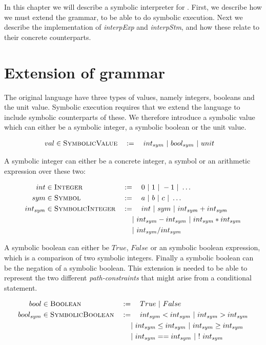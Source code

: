 In this chapter we will describe a symbolic interpreter for \explanguage. First, we describe how we must extend the grammar, to be able to do symbolic execution. Next we describe the implementation of \textsl{interpExp} and \textsl{interpStm}, and how these relate to their concrete counterparts. 
\section{Extension of grammar}

The original language have three types of values, namely integers, booleans and the unit value. Symbolic execution requires that we extend the language to include symbolic counterparts of these. We therefore introduce a symbolic value which can either be a symbolic integer, a symbolic boolean or the unit value.

\begin{alignat*}{3}
	val & \in \textsc{SymbolicValue} && := \quad int_{sym} \ | \ 
	bool_{sym} \ | \  unit
\end{alignat*}



 A symbolic integer can either be a concrete integer, a symbol or an arithmetic expression over these two:



\begin{alignat*}{3}
	int & \in \textsc{Integer} && := \quad 0 \ | \  1 \ | \  -1 \ | \  \ldots\\
	sym & \in \textsc{Symbol} && := \quad a \ | \  b \ | \  c \ | \  \ldots \\	
	int_{sym} & \in \textsc{SymbolicInteger} && := \quad int \ | \  sym \ | \  int_{sym} + int_{sym} \\
	& && \quad \ | \  int_{sym} - int_{sym} \ | \  int_{sym} * int_{sym}\\
	& && \quad \ | \  int_{sym} / int_{sym}\\
\end{alignat*}

A symbolic boolean can either be $True$, $False$ or an symbolic boolean expression, which is a comparison of two symbolic integers. Finally a symbolic boolean can be the negation of a symbolic boolean. This extension is needed to be able to represent the two different \emph{path-constraints} that might arise from a conditional statement.

\begin{alignat*}{3}
	bool & \in \textsc{Boolean} && := \quad True \alt False\\
	bool_{sym} & \in \textsc{SymbolicBoolean} && := \quad int_{sym} < int_{sym} \alt int_{sym} > int_{sym}\\
	& && \quad \alt int_{sym} \leq int_{sym} \alt  int_{sym} \geq int_{sym}\\
	& && \quad \alt  int_{sym} == int_{sym} \alt  ! \ int_{sym}
\end{alignat*}



